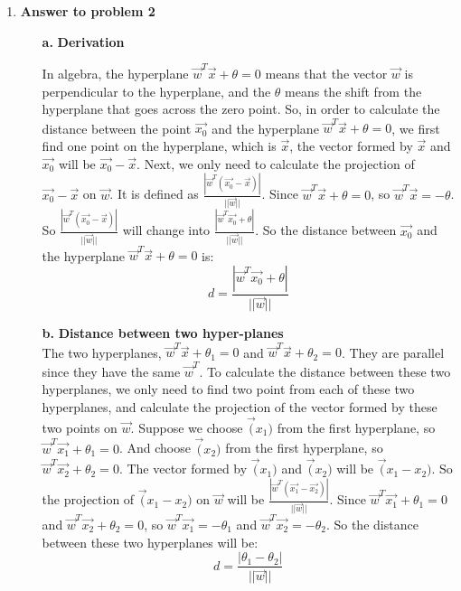 \begin{enumerate}
\item {\bf Answer to problem 2}

\begin{enumerate}
\item[{\bf a.}] {\bf Derivation\\}

In algebra, the hyperplane $\vec{w}^T \vec{x} + \theta = 0$ means that the vector $\vec{w}$ is perpendicular to the hyperplane, and the $\theta$ means the shift from the hyperplane that goes across the zero point. So, in order to calculate the distance between the point $\vec{x_0}$ and the hyperplane $\vec{w}^T \vec{x} + \theta = 0$, we first find one point on the hyperplane, which is $\vec{x}$, the vector formed by $\vec{x}$ and $\vec{x_0}$ will be $\vec{x_0}-\vec{x}$. Next, we only need to calculate the projection of $\vec{x_0}-\vec{x}$ on $\vec{w}$. It is defined as $\frac{|\vec{w}^T(\vec{x_0}-\vec{x})|}{||\vec{w}||}$. Since $\vec{w}^T \vec{x} + \theta = 0$, so $\vec{w}^T \vec{x} = - \theta$. So $\frac{|\vec{w}^T(\vec{x_0}-\vec{x})|}{||\vec{w}||}$ will change into $\frac{|\vec{w}^T \vec{x_0} + \theta|}{||\vec{w}||}$. So the distance between $\vec{x_0}$ and the hyperplane $\vec{w}^T \vec{x} + \theta = 0$ is:
\begin{displaymath}
d = \frac{|\vec{w}^T \vec{x_0} + \theta|}{||\vec{w}||}
\end{displaymath}

\item[{\bf b.}] {\bf Distance between two hyper-planes}\\

The two hyperplanes, $\vec{w}^T \vec{x} + \theta_1 = 0$ and $\vec{w}^T \vec{x} + \theta_2 = 0$. They are parallel since they have the same $\vec{w}^T$. To calculate the distance between these two hyperplanes, we only need to find two point from each of these two hyperplanes, and calculate the projection of the vector formed by these two points on $\vec{w}$. Suppose we choose $\vec(x_1)$ from the first hyperplane, so $\vec{w}^T \vec{x_1} + \theta_1 = 0$. And choose $\vec(x_2)$ from the first hyperplane, so $\vec{w}^T \vec{x_2} + \theta_2 = 0$. The vector formed by $\vec(x_1)$ and $\vec(x_2)$ will be $\vec(x_1 - x_2)$. So the projection of $\vec(x_1 - x_2)$ on $\vec{w}$ will be $\frac{|\vec{w}^T(\vec{x_1}-\vec{x_2})|}{||\vec{w}||}$. Since $\vec{w}^T \vec{x_1} + \theta_1 = 0$ and $\vec{w}^T \vec{x_2} + \theta_2 = 0$, so $\vec{w}^T \vec{x_1} = - \theta_1$ and $\vec{w}^T \vec{x_2} = - \theta_2$. So the distance between these two hyperplanes will be:
\begin{displaymath}
d = \frac{|\theta_1 - \theta_2|}{||\vec{w}||}
\end{displaymath}
\end{enumerate}


\end{enumerate}
